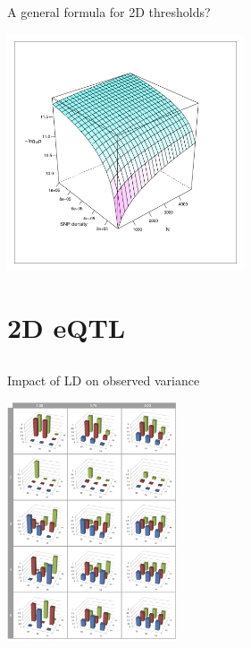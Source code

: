 \documentclass{beamer}
\begin{document}
\begin{frame}{A general formula for 2D thresholds?}
\begin{center}
\includegraphics[height=7cm]{threshold_function.pdf}
\end{center}
\end{frame}


\section{2D eQTL}
\subsection{}

\begin{frame}{Impact of LD on observed variance}
\begin{center}
\includegraphics[width=5cm]{gpmaps_ld.png} \\
\end{center}
\end{frame}
\end{document}
